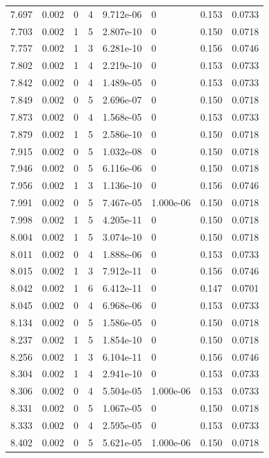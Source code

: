 \documentclass[preview]{standalone}
\begin{document}
{{{{{{{\begin{tabular}{L{1.2cm}C{1.2cm} C{0.3cm}C{0.5cm} C{1.4cm}C{1.4cm} C{1.4cm}C{1.4cm}}
  7.697  &  0.002  & 0     &  4 &  9.712e-06  & 0  & 0.153 &  0.0733   \\ 
  7.703  &  0.002  & 1     &  5 &  2.807e-10  & 0  & 0.150 &  0.0718   \\ 
  7.757  &  0.002  & 1     &  3 &  6.281e-10  & 0  & 0.156 &  0.0746   \\ 
  7.802  &  0.002  & 1     &  4 &  2.219e-10  & 0  & 0.153 &  0.0733   \\ 
  7.842  &  0.002  & 0     &  4 &  1.489e-05  & 0  & 0.153 &  0.0733   \\ 
  7.849  &  0.002  & 0     &  5 &  2.696e-07  & 0  & 0.150 &  0.0718   \\ 
  7.873  &  0.002  & 0     &  4 &  1.568e-05  & 0  & 0.153 &  0.0733   \\ 
  7.879  &  0.002  & 1     &  5 &  2.586e-10  & 0  & 0.150 &  0.0718   \\ 
  7.915  &  0.002  & 0     &  5 &  1.032e-08  & 0  & 0.150 &  0.0718   \\ 
  7.946  &  0.002  & 0     &  5 &  6.116e-06  & 0  & 0.150 &  0.0718   \\ 
  7.956  &  0.002  & 1     &  3 &  1.136e-10  & 0  & 0.156 &  0.0746   \\ 
  7.991  &  0.002  & 0     &  5 &  7.467e-05  & 1.000e-06  & 0.150 &  0.0718   \\ 
  7.998  &  0.002  & 1     &  5 &  4.205e-11  & 0  & 0.150 &  0.0718   \\ 
  8.004  &  0.002  & 1     &  5 &  3.074e-10  & 0  & 0.150 &  0.0718   \\ 
  8.011  &  0.002  & 0     &  4 &  1.888e-06  & 0  & 0.153 &  0.0733   \\ 
  8.015  &  0.002  & 1     &  3 &  7.912e-11  & 0  & 0.156 &  0.0746   \\ 
  8.042  &  0.002  & 1     &  6 &  6.412e-11  & 0  & 0.147 &  0.0701   \\ 
  8.045  &  0.002  & 0     &  4 &  6.968e-06  & 0  & 0.153 &  0.0733   \\ 
  8.134  &  0.002  & 0     &  5 &  1.586e-05  & 0  & 0.150 &  0.0718   \\ 
  8.237  &  0.002  & 1     &  5 &  1.854e-10  & 0  & 0.150 &  0.0718   \\ 
  8.256  &  0.002  & 1     &  3 &  6.104e-11  & 0  & 0.156 &  0.0746   \\ 
  8.304  &  0.002  & 1     &  4 &  2.941e-10  & 0  & 0.153 &  0.0733   \\ 
  8.306  &  0.002  & 0     &  4 &  5.504e-05  & 1.000e-06  & 0.153 &  0.0733   \\ 
  8.331  &  0.002  & 0     &  5 &  1.067e-05  & 0  & 0.150 &  0.0718   \\ 
  8.333  &  0.002  & 0     &  4 &  2.595e-05  & 0  & 0.153 &  0.0733   \\ 
  8.402  &  0.002  & 0     &  5 &  5.621e-05  & 1.000e-06  & 0.150 &  0.0718   \\ 
\hline 
\end{tabular} 

}}}}}}}
\end{document}
